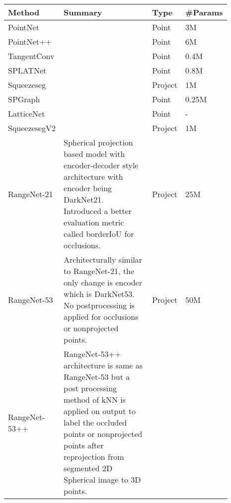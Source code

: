 \begin{table}[h!]
    \centering
    \begin{tabular}{|p{0.15\linewidth} | p{0.6\linewidth}| p{0.06\linewidth} |p{0.08\linewidth}|}
        \hline
        Method & Summary & Type & \#Params \\
        \hline 
        PointNet\cite{Qi_2017_CVPR_pointnet} &  & Point & 3M \\
        \hline
        PointNet++\cite{qi2017pointnet++} & & Point & 6M \\
        \hline
        TangentConv\cite{Tatarchenko_2018_CVPR_tangconv} & & Point & 0.4M\\
        \hline
        SPLATNet\cite{Su_2018_CVPR_splatnet} & & Point & 0.8M \\
        \hline
        Squeezeseg\cite{Sequeseseg_2018} & & Project & 1M \\
        \hline
        SPGraph\cite{SPGraph} & & Point & 0.25M\\
        \hline
        LatticeNet\cite{rosu2019latticenet} & & Point & - \\
        \hline
        SqueezesegV2\cite{SqueezeSegv2} & & Project & 1M \\
        \hline
        RangeNet-21\cite{Milioto2019} & 
        Spherical projection based model with encoder-decoder style architecture with encoder being DarkNet21.
        Introduced a better evaluation metric called borderIoU for occlusions.
        & Project & 25M \\
        \hline
        RangeNet-53\cite{Milioto2019}  & 
        Architecturally similar to RangeNet-21, the only change is encoder which is DarkNet53.
        No postprocessing is applied for occlusions or nonprojected points.
        & Project & 50M \\
        \hline
        RangeNet-53++\cite{Milioto2019} &
        RangeNet-53++ architecture is same as RangeNet-53 but a post processing method of kNN is applied on output to label the occluded points or nonprojected points after reprojection from segmented 2D Spherical image to 3D points.
        

\end{tabular}
\end{table}
